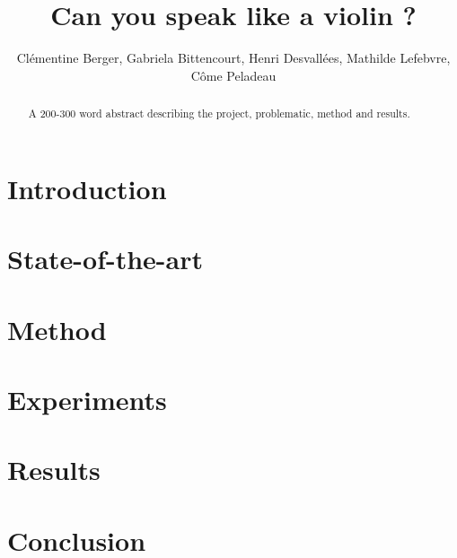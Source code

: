\documentclass{article}
\title{Can you speak like a violin ?}
\author{Clémentine Berger, Gabriela Bittencourt, Henri Desvallées, Mathilde Lefebvre, Côme Peladeau}
\begin{document}
\maketitle

\begin{abstract}
    A 200-300 word abstract describing the project, problematic, method and results.
\end{abstract}

\section{Introduction}

\section{State-of-the-art}

\section{Method}




\section{Experiments}

\section{Results}

\section{Conclusion}

\printbibliography
\end{document}
